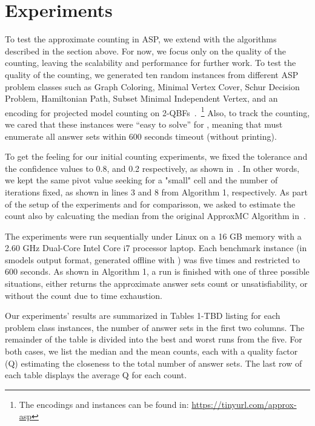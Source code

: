 \section{Experiments} \label{sec:experiments}

To test the approximate counting in ASP, we extend \xorro{} with the algorithms described in the section above.
For now, we focus only on the quality of the counting, leaving the scalability and performance for further work.
%
To test the quality of the counting,
we generated ten random instances from different ASP problem classes such as Graph Coloring, Minimal Vertex Cover, Schur Decision Problem, Hamiltonian Path, Subset Minimal Independent Vertex, and an encoding for projected model counting on 2-QBFs~\cite{KleineBuningLettman99}.~\footnote{The encodings and instances can be found in: \url{https://tinyurl.com/approx-asp}}
Also, to track the counting, we cared that these instances were ``easy to solve'' for \clasp{},
meaning that \clasp{} must enumerate all answer sets within 600 seconds timeout (without printing).

To get the feeling for our initial counting experiments, we fixed the tolerance and the confidence values to 0.8, and 0.2 respectively, as shown in~\cite{ChakrabortyMV13}.
In other words, we kept the same pivot value seeking for a "small" cell and the number of iterations fixed, as shown in lines 3 and 8 from Algorithm 1, respectively.
As part of the setup of the experiments and for comparisson, we asked \xorro{} to estimate the count also by calcuating the median from the original ApproxMC Algorithm in~\cite{ChakrabortyMV13}.

The experiments were run sequentially under Linux on a 16 GB memory with a 2.60 GHz Dual-Core Intel Core i7 processor laptop.
Each benchmark instance (in smodels output format, generated offline with \gringo{}) was five times and restricted to 600 seconds.
As shown in Algorithm 1, a run is finished with one of three possible situations, either \xorro{} returns the approximate answer sets count or unsatisfiability, or without the count due to time exhaustion.

Our experiments' results are summarized in Tables 1-TBD listing for each problem class instances, the number of answer sets in the first two columns.
The remainder of the table is divided into the best and worst runs from the five. 
%
For both cases, we list the median and the mean counts, each with a quality factor (Q) estimating the closeness to the total number of answer sets.
The last row of each table displays the average Q for each count.

